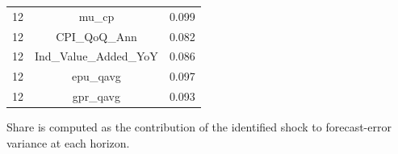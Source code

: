 \begin{table}[!htbp]
\begin{threeparttable}
\begin{tabular}{lcc}
12 & mu\_cp & 0.099 \\
12 & CPI\_QoQ\_Ann & 0.082 \\
12 & Ind\_Value\_Added\_YoY & 0.086 \\
12 & epu\_qavg & 0.097 \\
12 & gpr\_qavg & 0.093 \\
\bottomrule
\end{tabular}
\begin{tablenotes}[flushleft]
\footnotesize
\item Share is computed as the contribution of the identified shock to forecast-error variance at each horizon.
\end{tablenotes}
\end{threeparttable}
\end{table}
